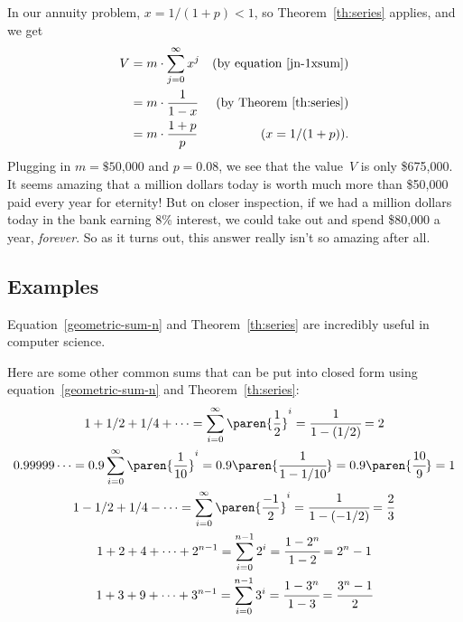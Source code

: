 In our annuity problem, $x=1/(1+p) < 1$, so Theorem~\ref{th:series}
applies, and we get
\begin{align*}
V & = m \cdot \sum_{j=0}^{\infty} x^j & \text{(by equation~\ref{jn-1xsum})}\\
  &= m\cdot \frac{1}{1-x} & \text{(by Theorem~\ref{th:series})}\\ &=
m\cdot \frac{1 + p}{p} &(x = 1/(1+p)).
\end{align*}
Plugging in $m = \text{\$50,000}$ and $p = 0.08$, we see that the
value~$V$ is only \$675,000.  It seems amazing that a million dollars
today is worth much more than \$50,000 paid every year for eternity!  But
on closer inspection, if we had a million dollars today in the bank
earning 8\% interest, we could take out and spend \$80,000 a year,
\emph{forever}.  So as it turns out, this answer really isn't so
amazing after all.

\subsection{Examples}

Equation~\ref{geometric-sum-n} and Theorem~\ref{th:series} are
incredibly useful in computer science.  

Here are some other common sums that can be put into closed form using
equation~\ref{geometric-sum-n} and Theorem~\ref{th:series}:
\begingroup {}
\begin{gather}
1 + 1/2 + 1/4 + \cdots = \sum_{i=0}^\infty \paren{\frac{1}{2}}^i %
= \cfrac{1}{1-(1/2)} = 2 \label{is2} \\ 0.99999\dots = 0.9
\sum_{i=0}^{\infty} \paren{\frac{1}{10}}^i = 0.9
\paren{\cfrac{1}{1-1/10}} = 0.9 \paren{\cfrac{10}{9}} = 1 \label{is1}
\\ 1 - 1/2 + 1/4 - \cdots = \sum_{i=0}^\infty \paren{\frac{-1}{2}}^i =
\cfrac{1}{1-(-1/2)} = \frac{2}{3} \label{is23} \\ 1 + 2 + 4 + \cdots +
2^{n-1} = \sum_{i=0}^{n-1} 2^i = \cfrac{1 - 2^n}{1 - 2} = 2^n -
1 \label{is2n1} \\ 1 + 3 + 9 + \cdots + 3^{n-1} = \sum_{i=0}^{n-1} 3^i
= \cfrac{1 - 3^n}{1 - 3} = \cfrac{3^n - 1}{2} \label{is3n1}
\end{gather}
\endgroup

